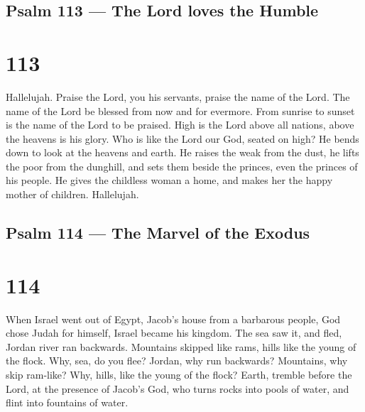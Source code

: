 \hypertarget{psalm-113-the-lord-loves-the-humble}{%
\subsection{Psalm 113 --- The Lord loves the
Humble}\label{psalm-113-the-lord-loves-the-humble}}

\hypertarget{section-112}{%
\section{113}\label{section-112}}

 Hallelujah. Praise the Lord, you his servants, praise the
name of the Lord.  The name of the Lord be blessed from now
and for evermore.  From sunrise to sunset is the name of the
Lord to be praised.  High is the Lord above all nations,
above the heavens is his glory.  Who is like the Lord our
God, seated on high?  He bends down to look at the heavens
and earth.  He raises the weak from the dust, he lifts the
poor from the dunghill,  and sets them beside the princes,
even the princes of his people.  He gives the childless
woman a home, and makes her the happy mother of children. Hallelujah.

\hypertarget{psalm-114-the-marvel-of-the-exodus}{%
\subsection{Psalm 114 --- The Marvel of the
Exodus}\label{psalm-114-the-marvel-of-the-exodus}}

\hypertarget{section-113}{%
\section{114}\label{section-113}}

 When Israel went out of Egypt, Jacob's house from a
barbarous people,  God chose Judah for himself, Israel
became his kingdom.  The sea saw it, and fled, Jordan river
ran backwards.  Mountains skipped like rams, hills like the
young of the flock.  Why, sea, do you flee? Jordan, why run
backwards?  Mountains, why skip ram-like? Why, hills, like
the young of the flock?  Earth, tremble before the Lord, at
the presence of Jacob's God,  who turns rocks into pools of
water, and flint into fountains of water.

